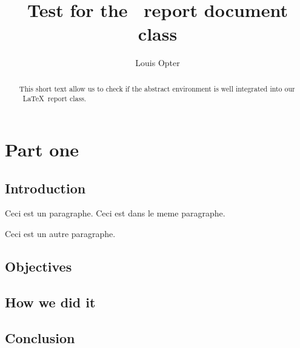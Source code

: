 \documentclass{rtxreport}
\author{Louis Opter}
\title{Test for the \rtx\ report document class}
\begin{document}
\maketitle

\begin{abstract}
This short text allow us to check if the abstract environment is well
integrated into our \rtx\ \LaTeX\ report class.
\end{abstract}

\rtxmaketitleblock

\tableofcontents

\chapter{Part one}

\section{Introduction}

\lipsum[1]

Ceci est un paragraphe.
Ceci est dans le meme paragraphe.

Ceci est un autre paragraphe.

\section{Objectives}

\lipsum[2]

\section{How we did it}

\lipsum[3]

\section{Conclusion}

\lipsum[4]
\end{document}
